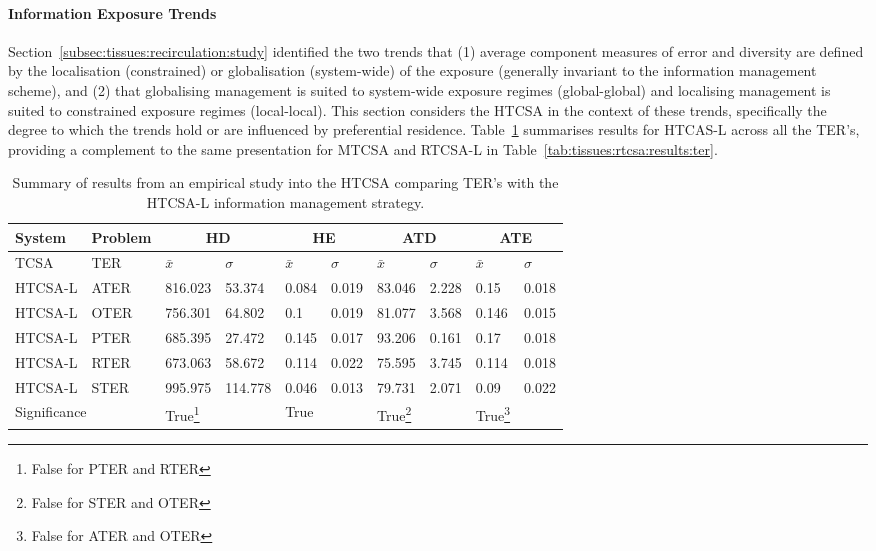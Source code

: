 %
%
\paragraph{Information Exposure Trends}
Section~\ref{subsec:tissues:recirculation:study} identified the two trends that (1) average component measures of error and diversity are defined by the localisation (constrained) or globalisation (system-wide) of the exposure (generally invariant to the information management scheme), and (2) that globalising management is suited to system-wide exposure regimes (global-global) and localising management is suited to constrained exposure regimes (local-local). This section considers the HTCSA in the context of these trends, specifically the degree to which the trends hold or are influenced by preferential residence. Table~\ref{tab:tissues:htcsa:results:ter} summarises results for HTCAS-L across all the TER's, providing a complement to the same presentation for MTCSA and RTCSA-L in Table~\ref{tab:tissues:rtcsa:results:ter}.

\begin{table}[ht]
	\centering\small
		\begin{minipage}{\textwidth} 
		\begin{tabular}{llllllllll}
		\toprule
		\textbf{System} & \textbf{Problem} & \multicolumn{2}{c}{\textbf{HD}} & \multicolumn{2}{c}{\textbf{HE}} & \multicolumn{2}{c}{\textbf{ATD}} & \multicolumn{2}{c}{\textbf{ATE}} \\ 
		\midrule
		TCSA & TER & $\bar{x}$ & $\sigma$ & $\bar{x}$ & $\sigma$ & $\bar{x}$ & $\sigma$ & $\bar{x}$ & $\sigma$ \\ 
		\toprule
		HTCSA-L & ATER & 816.023 & 53.374 & 0.084 & 0.019 & 83.046 & 2.228 & 0.15 & 0.018 \\ 
		HTCSA-L & OTER & 756.301 & 64.802 & 0.1 & 0.019 & 81.077 & 3.568 & 0.146 & 0.015 \\ 
		HTCSA-L & PTER & 685.395 & 27.472 & 0.145 & 0.017 & 93.206 & 0.161 & 0.17 & 0.018 \\ 
		HTCSA-L & RTER & 673.063 & 58.672 & 0.114 & 0.022 & 75.595 & 3.745 & 0.114 & 0.018 \\ 
		HTCSA-L & STER & 995.975 & 114.778 & 0.046 & 0.013 & 79.731 & 2.071 & 0.09 & 0.022 \\ 
		\multicolumn{2}{l}{Significance} & True\footnote{False for PTER and RTER} & & True & & True\footnote{False for STER and OTER} & & True\footnote{False for ATER and OTER} & \\ 
		\bottomrule
		\end{tabular}
		\end{minipage}
	\caption{Summary of results from an empirical study into the HTCSA comparing TER's with the HTCSA-L information management strategy.}
	\label{tab:tissues:htcsa:results:ter}
\end{table}

